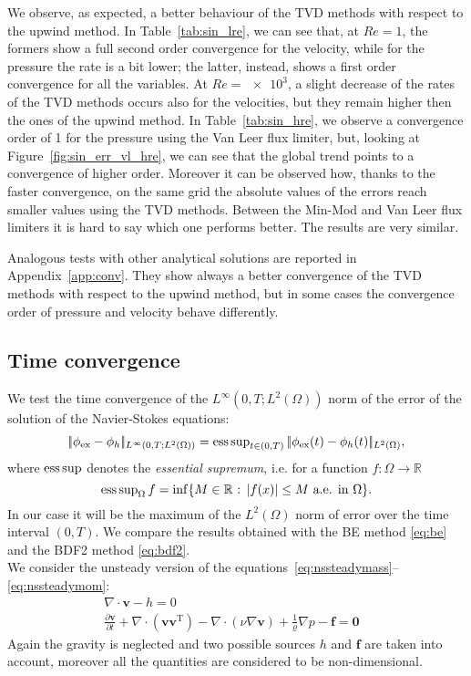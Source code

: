 We observe, as expected, a better behaviour of the TVD methods with respect to 
the upwind method. In Table~\ref{tab:sin_lre}, we can see that, at $Re=1$, the 
formers show a full second order convergence for the velocity, while for the pressure the
rate is a bit lower; the latter, instead, shows a first order convergence for 
all the variables. At 
$Re=\num{e3}$, a slight decrease of the rates of the TVD methods occurs also 
for 
the velocities, but they remain higher then the ones of the upwind method. In 
Table~\ref{tab:sin_hre}, we observe a convergence order of 1 for the pressure 
using the Van Leer flux limiter, but, looking at 
Figure~\ref{fig:sin_err_vl_hre}, we can 
see that the global trend points to a convergence of higher order. Moreover it 
can be observed how, thanks to the faster convergence, on the same grid the 
absolute values of the errors reach smaller values using the TVD methods. 
Between the Min-Mod and Van Leer flux limiters it is hard to say which one 
performs better. The results are very similar.

Analogous tests with other analytical solutions are reported in 
Appendix~\ref{app:conv}. They show always a better convergence of the TVD 
methods with respect to the upwind method, but in some cases the convergence 
order of pressure and velocity behave differently.
%
\subsection{Time convergence}
We test the time convergence of the $L^\infty(0,T;L^2(\Omega))$ norm of the 
error of the solution of the Navier-Stokes equations:
\begin{equation}
	|\!|\phi_\text{ex}-\phi_h|\!|_{L^\infty(0,T;L^2(\Omega))} = \operatorname{ess\,sup}_{t \in 
	(0,T)} |\!|\phi_\text{ex}(t) - \phi_h(t) |\!|_{L^2(\Omega)}, 
\end{equation}
where $\operatorname{ess\,sup}$ denotes the \emph{essential supremum}, i.e. for a function 
$f:\Omega\rightarrow\mathbb{R}$
\begin{equation}
	\operatorname{ess\,sup}_\Omega f = \inf \{\text{$M \in \mathbb{R}$ : $ |f(x)| \leq 
	M$ a.e. in $\Omega$} \}.
\end{equation}
In our case it will be the maximum of the $L^2(\Omega)$ norm of error over the 
time interval $(0,T)$. We compare the results 
obtained with the BE method \eqref{eq:be} and the BDF2 method \eqref{eq:bdf2}.\\
We consider the unsteady version of the 
equations~\eqref{eq:nssteadymass}--\eqref{eq:nssteadymom}:
\begin{align}
	\label{eq:nsunsteadymass} \nabla \cdot \mathbf{v} -h = 0&\\
	\label{eq:nsunsteadymom} \frac{\partial \mathbf{v}}{\partial t} +\nabla 
	\cdot (\mathbf{v} \mathbf{v}^\mathrm{T}) - 
	\nabla \cdot (\nu \nabla \mathbf{v}) + \frac{1}{\varrho}\nabla p  
	-\mathbf{f} = \mathbf{0}&
\end{align}
Again the gravity is neglected and two possible sources $h$ and $\mathbf{f}$ 
are taken into account, moreover all the quantities are considered to be 
non-dimensional.
%
